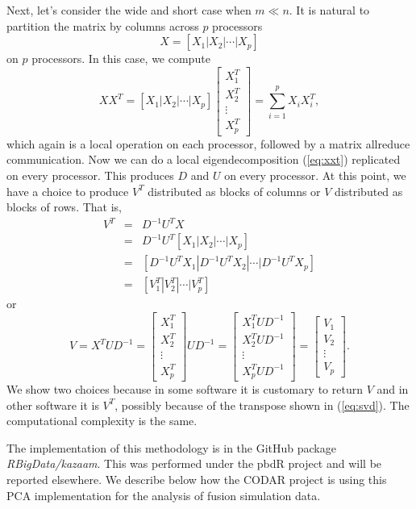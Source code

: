 Next, let's consider the wide and short case when $m \ll n$. It is
natural to partition the matrix by columns across $p$ processors
\begin{displaymath}
  X = \left[ X_1 | X_2 | \cdots | X_p \right]
\end{displaymath}
on $p$ processors. In this case, we compute
\begin{displaymath}
  X X^T = \left[ X_1 | X_2 | \cdots | X_p \right]
  \left[
    \begin{array}{c}
      X_1^T \\ X_2^T \\ \vdots \\ X_p^T
    \end{array} \right] =
  \sum_{i=1}^p X_iX_i^T,
\end{displaymath}
which again is a local operation on each processor, followed by a
matrix allreduce communication. Now we can do a local
eigendecomposition (\ref{eq:xxt}) replicated on every processor. This produces
$D$ and $U$ on every processor. At this point, we have a choice to produce
$V^T$ distributed as blocks of columns or $V$ distributed as blocks of
rows. That is,
\begin{eqnarray}
  V^T & = & D^{-1}U^TX \nonumber\\
      & = & D^{-1}U^T \left[ X_1 | X_2 | \cdots | X_p \right] \nonumber\\
      & = & \left[ D^{-1}U^TX_1 | D^{-1}U^TX_2 | \cdots | D^{-1}U^TX_p
            \right]\nonumber\\
      & = & \left[ V_1^T | V_2^T | \cdots | V_p^T \right] \nonumber
\end{eqnarray}
or
\begin{displaymath}
  V  =  X^TUD^{-1}
     =    \left[
          \begin{array}{c}
            X_1^T \\ X_2^T \\ \vdots \\ X_p^T
          \end{array}
          \right]
          UD^{-1}
     =  \left[
          \begin{array}{c}
            X_1^TUD^{-1} \\ X_2^TUD^{-1} \\ \vdots \\ X_p^TUD^{-1}
          \end{array}
          \right]
     =  \left[
          \begin{array}{c}
            V_1 \\ V_2 \\ \vdots \\ V_p
          \end{array}
          \right]. 
\end{displaymath}
We show two choices because in some software it is customary to return
$V$ and in other software it is $V^T$, possibly because of the
transpose shown in (\ref{eq:svd}). The computational complexity is the
same.

The implementation of this methodology is in the GitHub package {\it
  RBigData/kazaam}. This was performed under the pbdR project and will
be reported elsewhere. We describe below how the CODAR project is
using this PCA implementation for the analysis of fusion simulation
data. 
